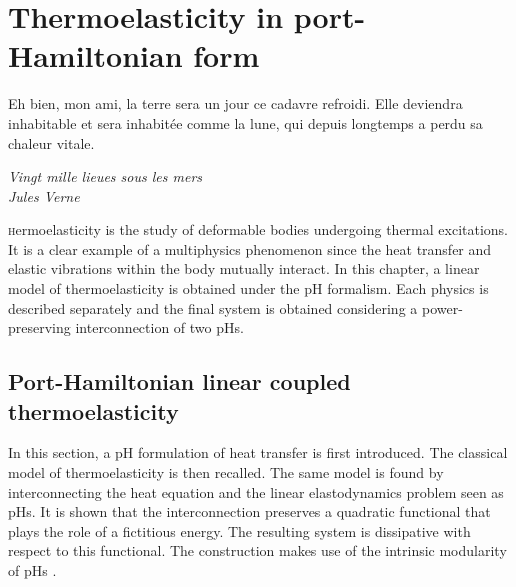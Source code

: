 \chapter{Thermoelasticity in port-Hamiltonian form}\label{ch:Thermo}

\epigraph{Eh bien, mon ami, la terre sera un jour ce cadavre refroidi. Elle deviendra inhabitable et sera inhabitée comme la lune, qui depuis longtemps a perdu sa chaleur vitale.}{\textit{Vingt mille lieues sous les mers\\
Jules Verne}}
\minitoc
 
\lettrine{\color{theme}{T}}hermoelasticity is the study of deformable bodies undergoing thermal excitations. It is a clear example of a multiphysics phenomenon since the heat transfer and elastic vibrations within the body mutually interact. In this chapter, a linear model of thermoelasticity is obtained under the pH formalism. Each physics is described separately and the final system is obtained considering a power-preserving interconnection of two pHs.


\section{Port-Hamiltonian linear coupled thermoelasticity}\label{sec:phthel}
In this section, a pH formulation of heat transfer is first introduced. The classical model of thermoelasticity is then recalled. The same model is found by interconnecting the heat equation and the linear elastodynamics problem seen as pHs. It is shown that the interconnection preserves a quadratic functional that plays the role of a fictitious energy. The resulting system is dissipative  with respect to this functional. The construction makes use of the intrinsic modularity of pHs \cite{kurula2010}.

